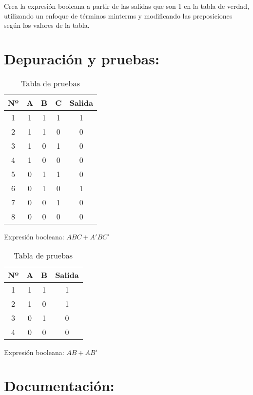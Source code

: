 \documentclass{IEEEcsmag}
\begin{document}
Crea la expresión booleana a partir de las salidas que son 1 en la tabla de verdad, utilizando un enfoque de términos minterms y modificando las preposiciones según los valores de la tabla.

\section*{Depuración y pruebas:}

\begin{table}[h]
\centering
\begin{tabular}{|c|c|c|c|c|}
\hline
\textbf{Nº} & \textbf{A} & \textbf{B} & \textbf{C} & \textbf{Salida} \\
\hline
1 & 1 & 1 & 1 & 1 \\
2 & 1 & 1 & 0 & 0 \\
3 & 1 & 0 & 1 & 0 \\
4 & 1 & 0 & 0 & 0 \\
5 & 0 & 1 & 1 & 0 \\
6 & 0 & 1 & 0 & 1 \\
7 & 0 & 0 & 1 & 0 \\
8 & 0 & 0 & 0 & 0 \\
\hline
\end{tabular}
\caption{Tabla de pruebas}
\end{table}
Expresión booleana: $ABC + A'BC'$

\begin{table}[h]
\centering
\begin{tabular}{|c|c|c|c|}
\hline
\textbf{Nº} & \textbf{A} & \textbf{B} & \textbf{Salida} \\
\hline
1 & 1 & 1 & 1 \\
2 & 1 & 0 & 1 \\
3 & 0 & 1 & 0 \\
4 & 0 & 0 & 0 \\
\hline
\end{tabular}
\caption{Tabla de pruebas}
\end{table}
Expresión booleana: $AB + AB'$


\section*{Documentación:}
\end{document}
